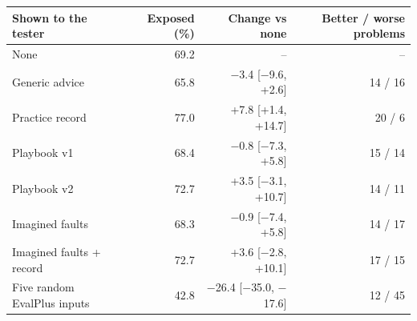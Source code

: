 \documentclass[11pt]{article}
\begin{document}
\begin{center}\small
\begin{tabular}{lrrr}
\toprule
Shown to the tester & Exposed (\%) & Change vs none & Better / worse problems\\
\midrule
None & 69.2 & -- & --\\
Generic advice & 65.8 & $-$3.4 [$-$9.6, +2.6] & 14 / 16\\
Practice record & 77.0 & +7.8 [+1.4, +14.7] & 20 / 6\\
Playbook v1 & 68.4 & $-$0.8 [$-$7.3, +5.8] & 15 / 14\\
Playbook v2 & 72.7 & +3.5 [$-$3.1, +10.7] & 14 / 11\\
Imagined faults & 68.3 & $-$0.9 [$-$7.4, +5.8] & 14 / 17\\
Imagined faults + record & 72.7 & +3.6 [$-$2.8, +10.1] & 17 / 15\\
Five random EvalPlus inputs & 42.8 & $-$26.4 [$-$35.0, $-$17.6] & 12 / 45\\
\bottomrule
\end{tabular}
\end{center}
\end{document}
